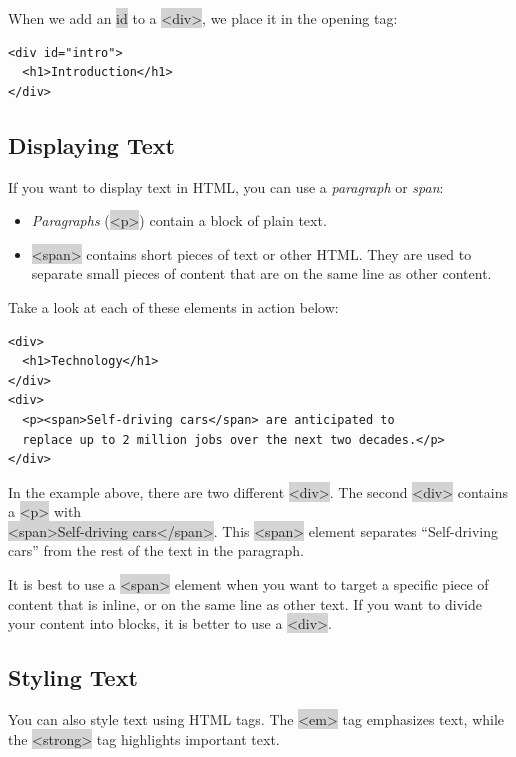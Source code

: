 \documentclass[11pt]{article}
\begin{document}
When we add an \colorbox{lightgray}{id} to a \colorbox{lightgray}{<div>}, we place it in the opening tag:
\begin{lstlisting}
<div id="intro">
  <h1>Introduction</h1>
</div>
\end{lstlisting}

\subsection{Displaying Text}
If you want to display text in HTML, you can use a \textit{paragraph} or \textit{span}:
\begin{itemize}[leftmargin = *]
\item \textit{Paragraphs} (\colorbox{lightgray}{<p>}) contain a block of plain text.
\item \colorbox{lightgray}{<span>} contains short pieces of text or other HTML. They are used to separate small pieces of content that are on the same line as other content.
\end{itemize}
Take a look at each of these elements in action below:
\begin{lstlisting}
<div>
  <h1>Technology</h1>
</div>
<div>
  <p><span>Self-driving cars</span> are anticipated to 
  replace up to 2 million jobs over the next two decades.</p>
</div>
\end{lstlisting}
In the example above, there are two different \colorbox{lightgray}{<div>}. The second \colorbox{lightgray}{<div>} contains a \colorbox{lightgray}{<p>} with \\
\colorbox{lightgray}{<span>Self-driving cars</span>}. This \colorbox{lightgray}{<span>} element separates “Self-driving cars” from the rest of the text in the paragraph.

It is best to use a \colorbox{lightgray}{<span>} element when you want to target a specific piece of content that is inline, or on the same line as other text. If you want to divide your content into blocks, it is better to use a \colorbox{lightgray}{<div>}.

\subsection{Styling Text}
You can also style text using HTML tags. The \colorbox{lightgray}{<em>} tag emphasizes text, while the \colorbox{lightgray}{<strong>} tag highlights important text.
\end{document}

